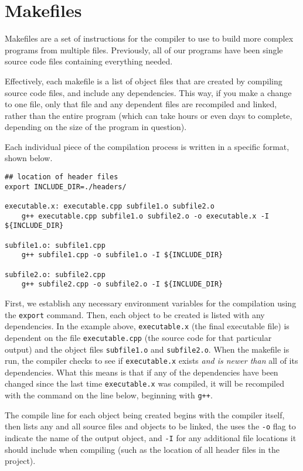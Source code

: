 \section{Makefiles}
Makefiles are a set of instructions for the compiler to use to build more complex programs from multiple files.  Previously, all of our programs have been single source code files containing everything needed.

Effectively, each makefile is a list of object files that are created by compiling source code files, and include any dependencies.  This way, if you make a change to one file, only that file and any dependent files are recompiled and linked, rather than the entire program (which can take hours or even days to complete, depending on the size of the program in question).

Each individual piece of the compilation process is written in a specific format, shown below.

\begin{verbatim}
## location of header files
export INCLUDE_DIR=./headers/

executable.x: executable.cpp subfile1.o subfile2.o
    g++ executable.cpp subfile1.o subfile2.o -o executable.x -I ${INCLUDE_DIR}
    
subfile1.o: subfile1.cpp
    g++ subfile1.cpp -o subfile1.o -I ${INCLUDE_DIR}
    
subfile2.o: subfile2.cpp
    g++ subfile2.cpp -o subfile2.o -I ${INCLUDE_DIR}
\end{verbatim}

First, we establish any necessary environment variables for the compilation using the \texttt{export} command.  Then, each object to be created is listed with any dependencies.  In the example above, \texttt{executable.x} (the final executable file) is dependent on the file \texttt{executable.cpp} (the source code for that particular output) and the object files \texttt{subfile1.o} and \texttt{subfile2.o}.  When the makefile is run, the compiler checks to see if \texttt{executable.x} exists \textit{and is newer than } all of its dependencies.  What this means is that if any of the dependencies have been changed since the last time \texttt{executable.x} was compiled, it will be recompiled with the command on the line below, beginning with \texttt{g++}.

The compile line for each object being created begins with the compiler itself, then lists any and all source files and objects to be linked, the uses the \texttt{-o} flag to indicate the name of the output object, and \texttt{-I} for any additional file locations it should include when compiling (such as the location of all header files in the project).

